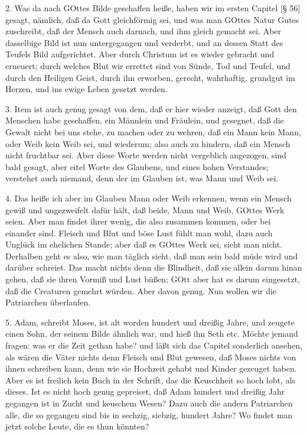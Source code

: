 2. Was da nach GOttes Bilde geschaffen heiße, haben wir im ersten Capitel [§ 56] gesagt, nämlich, daß da Gott gleichförmig sei, und was man GOttes Natur Gutes zuschreibt,
daß der Mensch auch darnach, und ihm gleich gemacht sei. Aber dasselbige Bild ist nun untergegangen und verderbt, und an dessen Statt des Teufels Bild aufgerichtet. Aber durch Christum ist es wieder gebracht und erneuert; durch welches Blut wir errettet sind von Sünde, Tod und Teufel, und durch den Heiligen Geist, durch ihn erworben, gerecht, wahrhaftig, grundgut im Herzen, und ins ewige Leben gesetzt werden.

3. Item ist auch genug gesagt von dem, daß er hier wieder anzeigt, daß Gott den Menschen habe geschaffen, ein Männlein und Fräulein, und gesegnet, daß die Gewalt nicht bei uns stehe, zu machen oder zu wehren, daß ein Mann kein Mann, oder Weib kein Weib sei, und wiederum; also auch zu hindern, daß ein Mensch nicht fruchtbar sei. Aber diese Worte werden nicht vergeblich angezogen, sind bald gesagt, aber eitel Worte des Glaubens, und eines hohen Verstandes; verstehet auch niemand, denn der im Glauben ist, was Mann und Weib sei.

4. Das heiße ich aber im Glauben Mann oder Weib erkennen, wenn ein Mensch gewiß und ungezweifelt dafür hält, daß beide, Mann und Weib, GOttes Werk seien. Aber man findet ihrer wenig, die also zusammen kommen, oder bei einander sind. Fleisch und Blut und böse Lust fühlt man wohl, dazu auch Unglück im ehelichen Stande; aber daß es GOttes Werk sei, sieht man nicht. Derhalben geht es also, wie man täglich sieht, daß man sein bald müde wird und darüber schreiet. Das macht nichts denn die Blindheit, daß sie allein darum hinan gehen, daß sie ihren Vormiß und Lust büßen; GOtt aber hat es darum eingesetzt, daß die Creaturen gemehrt würden. Aber davon genug. Nun wollen wir die Patriarchen überlaufen.

5. Adam, schreibt Moses, ist alt worden hundert und dreißig Jahre, und zeugete einen Sohn, der seinem Bilde ähnlich war, und hieß ihn Seth etc. Möchte jemand fragen: was er die Zeit gethan habe? und läßt sich das Capitel sonderlich ansehen, als wären die Väter nichts denn Fleisch und Blut gewesen, daß Moses nichts von ihnen schreiben kann, denn wie sie Hochzeit gehabt und Kinder gezeuget haben. Aber es ist freilich kein Buch in der Schrift, das die Keuschheit so hoch lobt, als dieses. Ist es nicht hoch genug gepreiset, daß Adam hundert und dreißig Jahr gegangen ist in Zucht und keuschem Wesen? Dazu auch die andern Patriarchen alle, die so gegangen sind bis in sechzig, siebzig, hundert Jahre? Wo findet man jetzt solche Leute, die es thun könnten?

